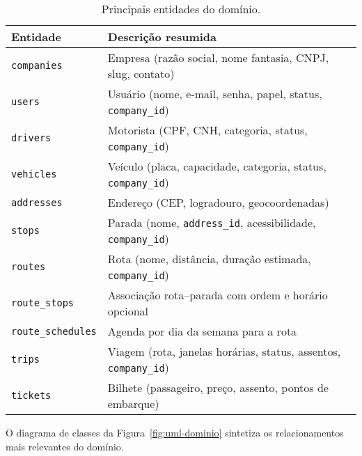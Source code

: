 \begin{table}[H]
\centering
\begin{tabular}{ll}
\toprule
\textbf{Entidade} & \textbf{Descrição resumida} \\
\midrule
\texttt{companies} & Empresa (razão social, nome fantasia, CNPJ, slug, contato) \\
\texttt{users} & Usuário (nome, e-mail, senha, papel, status, \texttt{company\_id}) \\
\texttt{drivers} & Motorista (CPF, CNH, categoria, status, \texttt{company\_id}) \\
\texttt{vehicles} & Veículo (placa, capacidade, categoria, status, \texttt{company\_id}) \\
\texttt{addresses} & Endereço (CEP, logradouro, geocoordenadas) \\
\texttt{stops} & Parada (nome, \texttt{address\_id}, acessibilidade, \texttt{company\_id}) \\
\texttt{routes} & Rota (nome, distância, duração estimada, \texttt{company\_id}) \\
\texttt{route\_stops} & Associação rota–parada com ordem e horário opcional \\
\texttt{route\_schedules} & Agenda por dia da semana para a rota \\
\texttt{trips} & Viagem (rota, janelas horárias, status, assentos, \texttt{company\_id}) \\
\texttt{tickets} & Bilhete (passageiro, preço, assento, pontos de embarque) \\
\bottomrule
\end{tabular}
\caption{Principais entidades do domínio.}
\label{tab:principais-entidades}
\end{table}

O diagrama de classes da Figura~\ref{fig:uml-dominio} sintetiza os relacionamentos mais relevantes do domínio.

